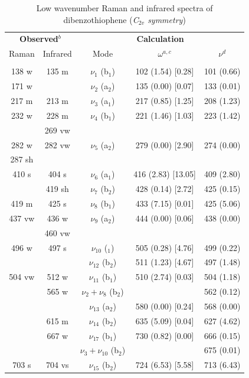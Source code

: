 	\begin{table}[H]
		\begin{center}
			\caption[Low wavenumber Raman and infrared spectra of dibenzothiophene]{Low wavenumber Raman and infrared spectra of dibenzothiophene (\textit{C$_{2v}$ symmetry})}  \label{tableP1-2}
			\begin{threeparttable}[b]
				\begin{tabular}{c c c c c}
					\toprule
					\multicolumn{2}{p{5cm}}{\centering \textbf{Observed$^{b}$}} & \multicolumn{3}{p{10cm}}{\centering \textbf{Calculation}} \\
					Raman & Infrared & Mode & $\omega^{a,c}$ & $\nu^{d}$ \\
					\midrule
					&  &   &    &   \\
					138 w & 135 m & $\nu_{1}$ (b$_{1}$) & 102 (1.54) [0.28] & 101 (0.66) \\
					171 w &  & $\nu_{2}$ (a$_{2}$) & 135 (0.00) [0.07] & 133 (0.01)\\
					217 m & 213 m & $\nu_{3}$ (a$_{1}$) & 217 (0.85) [1.25] & 208 (1.23) \\
					232 w & 228 m & $\nu_{4}$ (b$_{1}$) & 221 (1.46) [1.03] & 223 (1.42) \\
					& 269 vw &  &  &  \\
					282 w & 282 vw & $\nu_{5}$ (a$_{2}$) & 279 (0.00) [2.90] & 274 (0.00)\\
					287 sh & &  &  & \\
					410 s & 404 s & $\nu_{6}$ (a$_{1}$) & 416 (2.83) [13.05] & 409 (2.80)\\
					& 419 sh & $\nu_{7}$ (b$_{2}$) & 428 (0.14) [2.72] & 425 (0.15) \\
					419 m & 425 s & $\nu_{8}$ (b$_{1}$) & 433 (7.15) [0.01] & 425 (5.06) \\
					437 vw & 436 w & $\nu_{9}$ (a$_{2}$) & 444 (0.00) [0.06] & 438 (0.00) \\
					& 460 vw  &  &   & \\
					496 w & 497 s & $\nu_{10}$ ($_{1}$) & 505 (0.28) [4.76] & 499 (0.22) \\
					&  & $\nu_{12}$ (b$_{2}$) & 511 (1.23) [4.67] & 497 (1.48)\\
					504 vw & 512 w & $\nu_{11}$ (b$_{1}$) & 510 (2.74) [0.03] & 504 (1.18) \\
					& 565 w & $\nu_{2} + \nu_{8}$ (b$_{2}$) &   & 562 (0.12)\\
					&   &   $\nu_{13}$ (a$_{2}$) & 580 (0.00) [0.24] & 568 (0.00) \\
					& 615 m & $\nu_{14}$ (b$_{2}$) & 635 (5.09) [0.04] & 627 (4.62)\\
					& 667 w & $\nu_{17}$ (b$_{1}$) & 730 (0.82) [0.00] & 666 (0.15)\\
					&   &  $\nu_{3} + \nu_{10}$ (b$_{2}$) &  & 675 (0.01)\\
					703 s &704 vs &  $\nu_{15}$ (b$_{2}$) & 724 (6.53) [5.58] & 713 (6.43) \\
					\bottomrule 
				\end{tabular}
				

\end{threeparttable}
\end{center}
\end{table}
